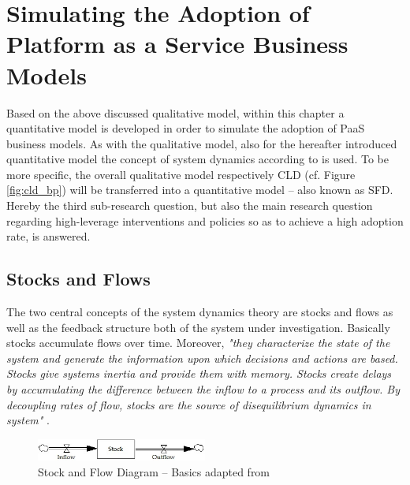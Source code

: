 \chapter{Simulating the Adoption of Platform as a Service Business Models}\label{ch:sfd}

Based on the above discussed qualitative model, within this chapter a quantitative model is developed in order to simulate the adoption of \ac{PaaS} business models. As with the qualitative model, also for the hereafter introduced quantitative model the concept of system dynamics according to \citet{Sterman2000,Sterman2001} is used. To be more specific, the overall qualitative model respectively \ac{CLD} (cf. Figure \ref{fig:cld_bp}) will be transferred into a quantitative model -- also known as \acf{SFD}. Hereby the third sub-research question, but also the main research question regarding high-leverage interventions and policies so as to achieve a high adoption rate, is answered.

\section{Stocks and Flows}\label{ch:sfd:sf}

The two central concepts of the system dynamics theory are stocks and flows as well as the feedback structure both of the system under investigation. Basically stocks accumulate flows over time. Moreover, \textit{"they characterize the state of the system and generate the information upon which decisions and actions are based. Stocks give systems inertia and provide them with memory. Stocks create delays by accumulating the difference between the inflow to a process and its outflow. By decoupling rates of flow, stocks are the source of disequilibrium dynamics in system"} \citep[p. 192]{Sterman2000}.

\begin{figure}[tb]
	\centering
	\includegraphics[width=0.5\textwidth]{gfx/sfd_basic}
	\caption[Stock and Flow Diagram -- Basics]{Stock and Flow Diagram -- Basics adapted from \citet[p. 194]{Sterman2000}}
	\label{fig:sfd_b}
\end{figure}

